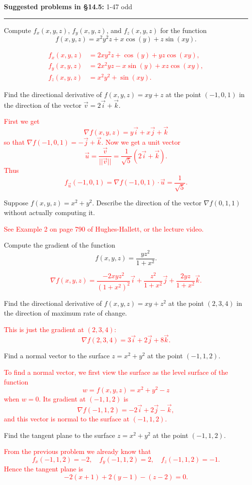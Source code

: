 \documentclass[12pt,reqno]{amsart}
\begin{document}
\textbf{Suggested problems in \S14.5:} 1-47 odd 

\medskip
\hrule

\bigskip

\prob Compute $f_x(x,y,z)$, $f_y(x,y,z)$, and $f_z(x,y,z)$ for the function
	\[f(x,y,z) = x^2y^2z + x\cos{(y)} + z \sin{(xy)}.
	\]

\bigskip
\textcolor{red}{
\begin{align*}
f_x(x,y,z) &= 2xy^2z + \cos{(y)} + yz\cos{(xy)}, \\
f_y(x,y,z) &= 2x^2yz - x\sin{(y)} + xz\cos{(xy)}, \\
f_z(x,y,z) &= x^2y^2 + \sin{(xy)}.
\end{align*}}
\bigskip

\prob Find the directional derivative of $f (x, y, z) = xy + z$ at the point $(-1, 0, 1)$ in the direction of the vector $\vec{v} = 2 \vec{i} + \vec{k}$.

\bigskip
\textcolor{red}{First we get
	\[\nabla f(x,y,z) = y\vec{i} + x\vec{j} + \vec{k}
	\]
so that $\nabla f(-1,0,1) = -\vec{j}+\vec{k}$. Now we get a unit vector
	\[\vec{u} = \frac{\vec{v}}{||\vec{v}||} = \frac{1}{\sqrt{5}}(2\vec{i} + \vec{k}).
	\]
Thus
	\[f_{\vec{u}}(-1,0,1) = \nabla f(-1,0,1) \cdot \vec{u} = \frac{1}{\sqrt{5}}.
	\]}
\bigskip

\prob Suppose $f(x,y,z) = x^2+y^2$. Describe the direction of the vector $\nabla f(0,1,1)$ without actually computing it.

\bigskip
\textcolor{red}{See Example 2 on page 790 of Hughes-Hallett, or the lecture video.}
\bigskip

\prob Compute the gradient of the function
	\[f(x,y,z) = \frac{yz^2}{1+x^2}.
	\]

\bigskip
\textcolor{red}{
	\[\nabla f(x,y,z) = \frac{-2xyz^2}{(1+x^2)^2} \vec{i} + \frac{z^2}{1+x^2} \vec{j} + \frac{2yz}{1+x^2} \vec{k}.
	\]}
\bigskip

\prob Find the directional derivative of $f(x,y,z) = xy+z^2$ at the point $(2,3,4)$ in the direction of maximum rate of change.

\bigskip
\textcolor{red}{This is just the gradient at $(2,3,4)$:
	\[\nabla f(2,3,4) = 3 \vec{i} +2\vec{j}+ 8 \vec{k}.
	\]}
\bigskip

\newpage
\prob Find a normal vector to the surface $z=x^2+y^2$ at the point $(-1,1,2)$.

\bigskip
\textcolor{red}{To find a normal vector, we first view the surface as the level surface of the function
	\[w = f(x,y,z) = x^2+y^2-z
	\]
when $w=0$. Its gradient at $(-1,1,2)$ is
	\[\nabla f(-1,1,2) = -2\vec{i} +2\vec{j} - \vec{k},
	\]
and this vector is normal to the surface at $(-1,1,2)$.}
\bigskip

\prob Find the tangent plane to the surface $z=x^2+y^2$ at the point $(-1,1,2)$.

\bigskip
\textcolor{red}{From the previous problem we already know that
	\[f_x(-1,1,2) = -2, \quad f_y(-1,1,2) = 2, \quad f_z(-1,1,2) = -1.
	\]
Hence the tangent plane is
	\[-2(x+1) + 2(y-1) - (z-2) = 0.
	\]}
\end{document}
